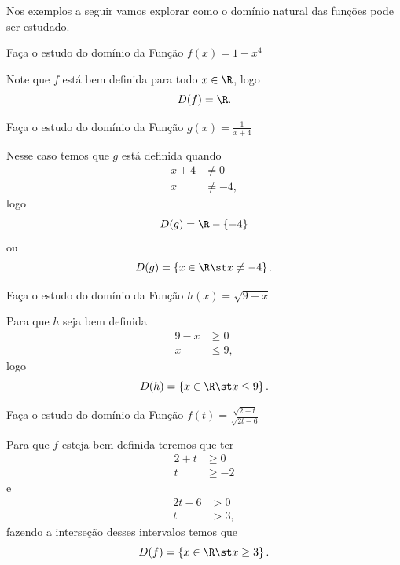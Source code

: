 Nos exemplos a seguir vamos explorar como o domínio natural das funções
pode ser estudado.

\begin{example}
  Faça o estudo do domínio da Função
  \(
    f(x) = 1-x^4
  \)

  \solution
  Note que $f$ está bem definida para todo $x \in \R$, logo
  \[
    D(f) = \R.
  \]
\end{example}

\begin{example}
  Faça o estudo do domínio da Função
  \(
    g(x) = \frac{1}{x+4}
  \)

  \solution
  Nesse caso temos que $g$ está definida quando
  \begin{align*}
    x+4 & \neq 0 \\
    x   & \neq -4,
  \end{align*}
  logo
  \[
    D(g) = \R-\left\{-4\right\}
  \]
  ou
  \[
    D(g) = \left\{ x \in \R \st x \neq -4 \right\}.
  \]
\end{example}

\begin{example}
  Faça o estudo do domínio da Função
  \(
    h(x) = \sqrt{9-x}
  \)

  \solution
  Para que $h$ seja bem definida
  \begin{align*}
    9-x & \geq 0 \\
    x   & \leq 9,
  \end{align*}
  logo
  \[
    D(h) = \left\{ x \in \R \st x \leq 9 \right\}.
  \]
\end{example}

\begin{example}
  Faça o estudo do domínio da Função
  \(
    f(t) = \frac{\sqrt{2+t}}{\sqrt{2t-6}}
  \)

  \solution
  Para que $f$ esteja bem definida teremos que ter
  \begin{align*}
    2+t & \geq 0 \\
    t   & \geq -2
  \end{align*}
  e
  \begin{align*}
    2t-6 & > 0 \\
    t    & > 3,
  \end{align*}
  fazendo a interseção desses intervalos temos que
  \[
    D(f) = \left\{ x \in \R \st x \geq 3 \right\}.
  \]
\end{example}


